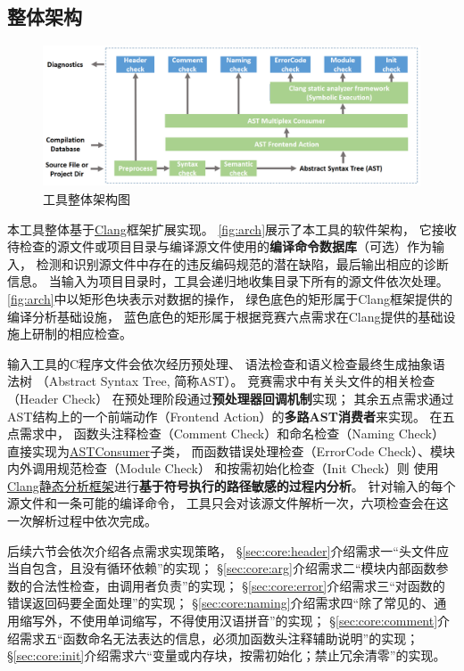 \subsection{整体架构}
\label{sec:core:arch}

\begin{figure}[htbp]
\centering
\includegraphics[width=\textwidth]{figure/architecture}
\caption{工具整体架构图}
\label{fig:arch}
\end{figure}

本工具整体基于\href{https://clang.llvm.org/}{Clang}框架扩展实现。
\autoref{fig:arch}展示了本工具的软件架构，
它接收待检查的源文件或项目目录与编译源文件使用的{\bf 编译命令数据库}（可选）作为输入，
检测和识别源文件中存在的违反编码规范的潜在缺陷，最后输出相应的诊断信息。
当输入为项目目录时，工具会递归地收集目录下所有的源文件依次处理。
\autoref{fig:arch}中以矩形色块表示对数据的操作，
绿色底色的矩形属于Clang框架提供的编译分析基础设施，
蓝色底色的矩形属于根据竞赛六点需求在Clang提供的基础设施上研制的相应检查。

输入工具的C程序文件会依次经历预处理、
语法检查和语义检查最终生成抽象语法树
（Abstract Syntax Tree, 简称AST）。
竞赛需求中有关头文件的相关检查（Header Check）
在预处理阶段通过\textbf{预处理器回调机制}实现；
其余五点需求通过AST结构上的一个前端动作（Frontend Action）的\textbf{多路AST消费者}来实现。
在五点需求中，
函数头注释检查（Comment Check）和命名检查（Naming Check）
直接实现为\href{https://clang.llvm.org/doxygen/classclang_1_1ASTConsumer.html}{ASTConsumer}子类，
而函数错误处理检查（ErrorCode Check）、模块内外调用规范检查（Module Check）
和按需初始化检查（Init Check）则
使用\href{https://clang-analyzer.llvm.org/}{Clang静态分析框架}进行\textbf{基于符号执行的路径敏感的过程内分析}。
针对输入的每个源文件和一条可能的编译命令，
工具只会对该源文件解析一次，六项检查会在这一次解析过程中依次完成。

后续六节会依次介绍各点需求实现策略，
\S\ref{sec:core:header}介绍需求一“头文件应当自包含，且没有循环依赖”的实现；
\S\ref{sec:core:arg}介绍需求二“模块内部函数参数的合法性检查，由调用者负责”的实现；
\S\ref{sec:core:error}介绍需求三“对函数的错误返回码要全面处理”的实现；
\S\ref{sec:core:naming}介绍需求四“除了常见的、通用缩写外，不使用单词缩写，不得使用汉语拼音”的实现；
\S\ref{sec:core:comment}介绍需求五“函数命名无法表达的信息，必须加函数头注释辅助说明”的实现；
\S\ref{sec:core:init}介绍需求六“变量或内存块，按需初始化；禁止冗余清零”的实现。
